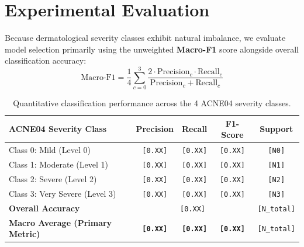 \documentclass[11pt,a4paper]{article}
\begin{document}
\section{Experimental Evaluation}
\label{sec:evaluation}
Because dermatological severity classes exhibit natural imbalance, we evaluate model selection primarily using the unweighted \textbf{Macro-F1} score alongside overall classification accuracy:
\begin{equation}
    \text{Macro-F1} = \frac{1}{4} \sum_{c=0}^{3} \frac{2 \cdot \text{Precision}_c \cdot \text{Recall}_c}{\text{Precision}_c + \text{Recall}_c}
\end{equation}

\begin{table}[H]
    \centering
    \caption{Quantitative classification performance across the 4 ACNE04 severity classes.}
    \label{tab:metrics}
    \begin{tabular}{lcccc}
        \toprule
        \textbf{ACNE04 Severity Class} & \textbf{Precision} & \textbf{Recall} & \textbf{F1-Score} & \textbf{Support} \\
        \midrule
        Class 0: Mild (Level 0)        & \texttt{[0.XX]} & \texttt{[0.XX]} & \texttt{[0.XX]} & \texttt{[N0]} \\
        Class 1: Moderate (Level 1)    & \texttt{[0.XX]} & \texttt{[0.XX]} & \texttt{[0.XX]} & \texttt{[N1]} \\
        Class 2: Severe (Level 2)      & \texttt{[0.XX]} & \texttt{[0.XX]} & \texttt{[0.XX]} & \texttt{[N2]} \\
        Class 3: Very Severe (Level 3) & \texttt{[0.XX]} & \texttt{[0.XX]} & \texttt{[0.XX]} & \texttt{[N3]} \\
        \midrule
        \textbf{Overall Accuracy}      & \multicolumn{3}{c}{\texttt{[0.XX]}}               & \texttt{[N\_total]} \\
        \textbf{Macro Average (Primary Metric)} & \textbf{\texttt{[0.XX]}} & \textbf{\texttt{[0.XX]}} & \textbf{\texttt{[0.XX]}} & \texttt{[N\_total]} \\
        \bottomrule
    \end{tabular}
\end{table}
\end{document}
